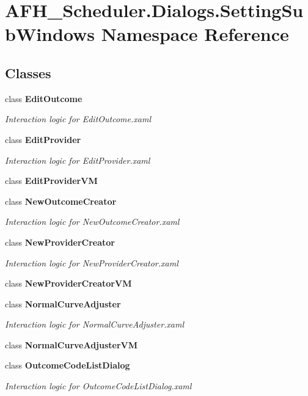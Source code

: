\section{A\+F\+H\+\_\+\+Scheduler.\+Dialogs.\+Setting\+Sub\+Windows Namespace Reference}
\label{namespace_a_f_h___scheduler_1_1_dialogs_1_1_setting_sub_windows}
\subsection*{Classes}
\begin{DoxyCompactItemize}
\item 
class \textbf{ Edit\+Outcome}
\begin{DoxyCompactList}\small\item\em Interaction logic for Edit\+Outcome.\+xaml \end{DoxyCompactList}\item 
class \textbf{ Edit\+Provider}
\begin{DoxyCompactList}\small\item\em Interaction logic for Edit\+Provider.\+xaml \end{DoxyCompactList}\item 
class \textbf{ Edit\+Provider\+VM}
\item 
class \textbf{ New\+Outcome\+Creator}
\begin{DoxyCompactList}\small\item\em Interaction logic for New\+Outcome\+Creator.\+xaml \end{DoxyCompactList}\item 
class \textbf{ New\+Provider\+Creator}
\begin{DoxyCompactList}\small\item\em Interaction logic for New\+Provider\+Creator.\+xaml \end{DoxyCompactList}\item 
class \textbf{ New\+Provider\+Creator\+VM}
\item 
class \textbf{ Normal\+Curve\+Adjuster}
\begin{DoxyCompactList}\small\item\em Interaction logic for Normal\+Curve\+Adjuster.\+xaml \end{DoxyCompactList}\item 
class \textbf{ Normal\+Curve\+Adjuster\+VM}
\item 
class \textbf{ Outcome\+Code\+List\+Dialog}
\begin{DoxyCompactList}\small\item\em Interaction logic for Outcome\+Code\+List\+Dialog.\+xaml \end{DoxyCompactList}\item 

\end{DoxyCompactItemize}
